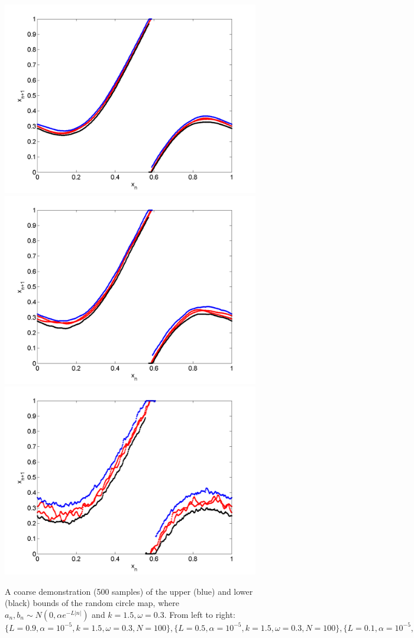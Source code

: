 \begin{figure}[htp]
\caption[Upper and lower bounds on the random circle map, with a normal
distribution, where $k=1.5,\omega=0.3$]{A coarse
  demonstration (500 samples) of the upper (blue) and lower (black)
  bounds of the random circle map, where $a_n,b_n\sim N(0,\alpha e^{-L|n|})$
  and $k=1.5,\omega=0.3$. From left to right:
  $\{L=0.9,\alpha = 10^{-5},k=1.5,\omega=0.3,N=100\}, \{L=0.5,\alpha = 10^{-5},k=1.5,\omega=0.3,N=100\},\{L=0.1,\alpha = 10^{-5},k=1.5,\omega=0.3,N=100\},$
  }\label{fig:circ_n_envelope2}
\centering
\includegraphics[width=.3\textwidth]{figs/envelope_norm_500_k15_L09_w03.png}\hfill
\includegraphics[width=.3\textwidth]{figs/envelope_norm_500_k15_L05_w03.png}\hfill
\includegraphics[width=.3\textwidth]{figs/envelope_norm_500_k15_L01_w03.png}
\end{figure}
